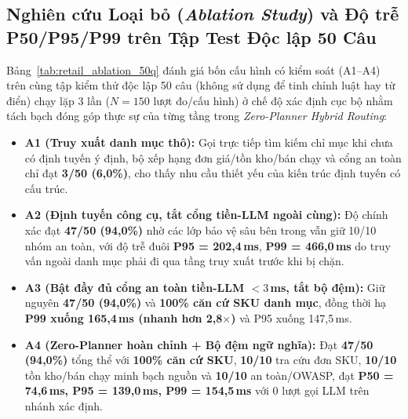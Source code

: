 \subsection*{Nghiên cứu Loại bỏ (\emph{Ablation Study}) và Độ trễ P50/P95/P99 trên Tập Test Độc lập 50 Câu}
Bảng~\ref{tab:retail_ablation_50q} đánh giá bốn cấu hình có kiểm soát (A1--A4) trên cùng tập kiểm thử độc lập 50 câu (không sử dụng để tinh chỉnh luật hay từ điển) chạy lặp 3 lần ($N=150$ lượt đo/cấu hình) ở chế độ xác định cục bộ nhằm tách bạch đóng góp thực sự của từng tầng trong \emph{Zero-Planner Hybrid Routing}:
\begin{itemize}
    \item \textbf{A1 (Truy xuất danh mục thô):} Gọi trực tiếp tìm kiếm chỉ mục khi chưa có định tuyến ý định, bộ xếp hạng đơn giá/tồn kho/bán chạy và cổng an toàn chỉ đạt \textbf{3/50 (6,0\%)}, cho thấy nhu cầu thiết yếu của kiến trúc định tuyến có cấu trúc.
    \item \textbf{A2 (Định tuyến công cụ, tắt cổng tiền-LLM ngoài cùng):} Độ chính xác đạt \textbf{47/50 (94,0\%)} nhờ các lớp bảo vệ sâu bên trong vẫn giữ 10/10 nhóm an toàn, với độ trễ đuôi \textbf{P95 = 202,4\,ms}, \textbf{P99 = 466,0\,ms} do truy vấn ngoài danh mục phải đi qua tầng truy xuất trước khi bị chặn.
    \item \textbf{A3 (Bật đầy đủ cổng an toàn tiền-LLM $<3$\,ms, tắt bộ đệm):} Giữ nguyên \textbf{47/50 (94,0\%)} và \textbf{100\% căn cứ SKU danh mục}, đồng thời hạ \textbf{P99 xuống 165,4\,ms (nhanh hơn 2,8$\times$)} và P95 xuống 147,5\,ms.
    \item \textbf{A4 (Zero-Planner hoàn chỉnh + Bộ đệm ngữ nghĩa):} Đạt \textbf{47/50 (94,0\%)} tổng thể với \textbf{100\% căn cứ SKU}, \textbf{10/10} tra cứu đơn SKU, \textbf{10/10} tồn kho/bán chạy minh bạch nguồn và \textbf{10/10} an toàn/OWASP, đạt \textbf{P50 = 74,6\,ms, P95 = 139,0\,ms, P99 = 154,5\,ms} với 0 lượt gọi LLM trên nhánh xác định.
\end{itemize}

